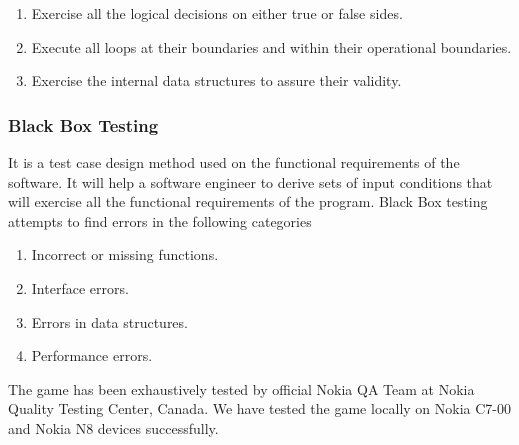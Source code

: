 \documentclass[a4paper,12pt]{article}
\begin{document}
\begin{enumerate}
 \item Exercise all the logical decisions on either true or false sides.
 \item Execute all loops at their boundaries and within their operational boundaries.
 \item Exercise the internal data structures to assure their validity.
\end{enumerate}

\subsubsection{Black Box Testing}
\hspace{18pt}It is a test case design method used on the functional requirements of the software. It will help a software engineer to derive sets of input conditions that will exercise all the functional requirements of the program. Black Box testing attempts to find errors in the following categories

\begin{enumerate}
 \item Incorrect or missing functions.
 \item Interface errors.
 \item Errors in data structures.
 \item Performance errors.
\end{enumerate}



The game has been exhaustively tested by official Nokia QA Team at Nokia Quality Testing Center, Canada. We have tested the game locally on Nokia C7-00 and Nokia N8 devices successfully.\\


\end{document}
